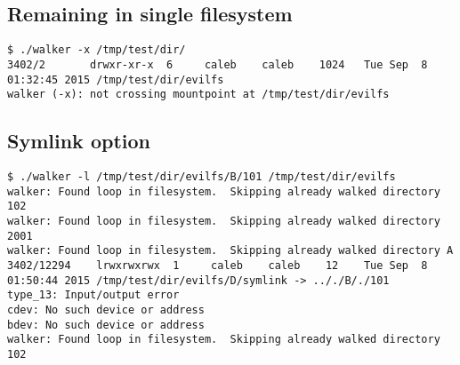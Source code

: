 \documentclass{article}
\begin{document}
\subsection{Remaining in single filesystem}

\begin{lstlisting}
$ ./walker -x /tmp/test/dir/
3402/2       drwxr-xr-x  6     caleb    caleb    1024   Tue Sep  8 01:32:45 2015 /tmp/test/dir/evilfs 
walker (-x): not crossing mountpoint at /tmp/test/dir/evilfs
\end{lstlisting}

\subsection{Symlink option}

\begin{lstlisting}
$ ./walker -l /tmp/test/dir/evilfs/B/101 /tmp/test/dir/evilfs
walker: Found loop in filesystem.  Skipping already walked directory 102
walker: Found loop in filesystem.  Skipping already walked directory 2001
walker: Found loop in filesystem.  Skipping already walked directory A
3402/12294    lrwxrwxrwx  1     caleb    caleb    12    Tue Sep  8 01:50:44 2015 /tmp/test/dir/evilfs/D/symlink -> .././B/./101
type_13: Input/output error
cdev: No such device or address
bdev: No such device or address
walker: Found loop in filesystem.  Skipping already walked directory 102

\end{lstlisting}
\end{document}

